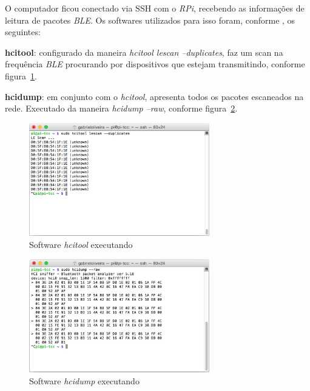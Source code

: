 \documentclass[
		12pt,				%
		openright,			%
		oneside,			%
		a4paper,			%
		chapter=TITLE,		%
		english,			%
		brazil				%
	]{abntex2}
\begin{document}
O computador ficou conectado via SSH com o \textit{RPi}, recebendo as informações de leitura de pacotes \textit{BLE}. Os softwares utilizados para isso foram, conforme , os seguintes:

\begin{alineas}
	\item \textbf{hcitool}: configurado da maneira \textit{hcitool lescan --duplicates}, faz um scan na frequência \textit{BLE} procurando por dispositivos que estejam transmitindo, conforme figura~\ref{fig:hcitool-lescan}.
	\item \textbf{hcidump}: em conjunto com o \textit{hcitool}, apresenta todos os pacotes escaneados na rede. Executado da maneira \textit{hcidump --raw}, conforme figura~\ref{fig:hcidump}.
\end{alineas}

\begin{figure}[htb]
	\caption{\label{fig:hcitool-lescan}Software \textit{hcitool} executando}
	\begin{center}
		\includegraphics[width=0.7\textwidth]{img/hcitool-lescan.png}
	\end{center}
\end{figure}

\begin{figure}[htb]
	\caption{\label{fig:hcidump}Software \textit{hcidump} executando}
	\begin{center}
		\includegraphics[width=0.7\textwidth]{img/hcidump.png}
	\end{center}
\end{figure}
\end{document}
